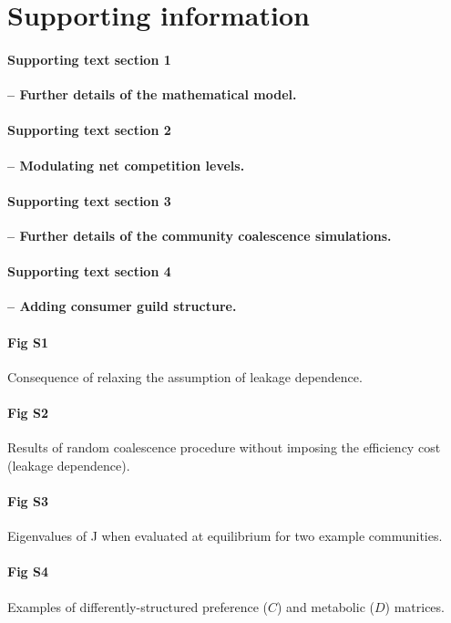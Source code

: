 \documentclass[10pt,letterpaper]{article}
\begin{document}
\section*{Supporting information}


\paragraph*{Supporting text section 1}\textbf{--  Further details of the mathematical model.}
\label{S1_model}
\paragraph*{Supporting text section 2}\textbf{--  Modulating net competition levels.}
\label{S2_modulating}
\paragraph*{Supporting text section 3}\textbf{--  Further details of the community coalescence simulations.}
\label{S3_simulation_details}
\paragraph*{Supporting text section 4}\textbf{--  Adding consumer guild structure.}
\label{S4_guilds}

\paragraph*{Fig S1} Consequence of relaxing the assumption of leakage dependence.
\label{S1Fig}
\paragraph*{Fig S2} Results  of  random  coalescence  procedure  without  imposing  the  efficiency cost (leakage dependence).
\label{S2Fig}
\paragraph*{Fig S3} Eigenvalues of J when evaluated
at equilibrium for two example communities.
\label{fig:S3Fig}
\paragraph*{Fig S4} Examples of differently-structured preference ($C$) and metabolic ($D$) matrices.
\label{fig:S4Fig}
\end{document}
